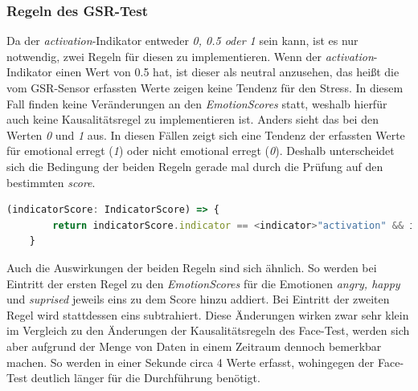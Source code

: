 \subsubsection{Regeln des GSR-Test}
Da der \textit{activation}-Indikator entweder \textit{0, 0.5 oder 1} sein kann, ist es nur notwendig, zwei Regeln für diesen zu implementieren. Wenn der \textit{activation}-Indikator einen Wert von 0.5 hat, ist dieser als neutral anzusehen, das heißt die vom GSR-Sensor erfassten Werte zeigen keine Tendenz für den Stress. In diesem Fall finden keine Veränderungen an den \textit{EmotionScores} statt, weshalb hierfür auch keine Kausalitätsregel zu implementieren ist. Anders sieht das bei den Werten \textit{0} und \textit{1} aus. In diesen Fällen zeigt sich eine Tendenz der erfassten Werte für emotional erregt (\textit{1}) oder nicht emotional erregt (\textit{0}). Deshalb unterscheidet sich die Bedingung der beiden Regeln gerade mal durch die Prüfung auf den bestimmten \textit{score}. \newline
\begin{lstlisting}[caption={Bedingung der ersten Kausalitätsregel (emotional erregt)}, language=JavaScript]
	(indicatorScore: IndicatorScore) => {
		return indicatorScore.indicator == <indicator>"activation" && indicatorScore.score == 1;
	}
\end{lstlisting}
Auch die Auswirkungen der beiden Regeln sind sich ähnlich. So werden bei Eintritt der ersten Regel zu den \textit{EmotionScores} für die Emotionen \textit{angry, happy} und \textit{suprised} jeweils eins zu dem Score hinzu addiert. Bei Eintritt der zweiten Regel wird stattdessen eins subtrahiert. Diese Änderungen wirken zwar sehr klein im Vergleich zu den Änderungen der Kausalitätsregeln des Face-Test, werden sich aber aufgrund der Menge von Daten in einem Zeitraum dennoch bemerkbar machen. So werden in einer Sekunde circa 4 Werte erfasst, wohingegen der Face-Test deutlich länger für die Durchführung benötigt.
